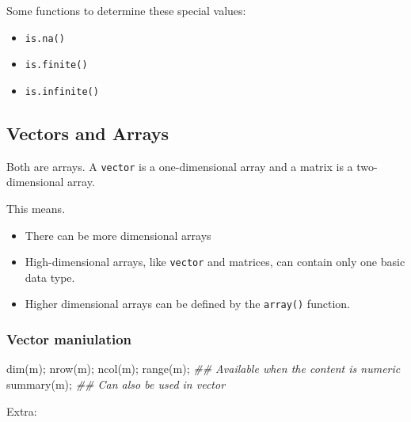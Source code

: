 \documentclass[
]{article}
\newenvironment{Shaded}{}{}
\newcommand{\DocumentationTok}[1]{\textcolor[rgb]{0.73,0.13,0.13}{\textit{#1}}}
\newcommand{\FunctionTok}[1]{\textcolor[rgb]{0.02,0.16,0.49}{#1}}
\newcommand{\NormalTok}[1]{#1}
\begin{document}
Some functions to determine these special values:

\begin{itemize}
\item
  \texttt{is.na()}
\item
  \texttt{is.finite()}
\item
  \texttt{is.infinite()}
\end{itemize}

\hypertarget{vectors-and-arrays}{%
\subsection{Vectors and Arrays}\label{vectors-and-arrays}}

Both are arrays. A \texttt{vector} is a one-dimensional array and a
matrix is a two-dimensional array.

This means.

\begin{itemize}
\item
  There can be more dimensional arrays
\item
  High-dimensional arrays, like \texttt{vector} and matrices, can
  contain only one basic data type.
\item
  Higher dimensional arrays can be defined by the \texttt{array()}
  function.
\end{itemize}

\hypertarget{vector-maniulation}{%
\subsubsection{Vector maniulation}\label{vector-maniulation}}

\begin{Shaded}
\begin{Highlighting}[]
\FunctionTok{dim}\NormalTok{(m);}
\FunctionTok{nrow}\NormalTok{(m);}
\FunctionTok{ncol}\NormalTok{(m);}
\FunctionTok{range}\NormalTok{(m); }\DocumentationTok{\#\# Available when the content is numeric}
\FunctionTok{summary}\NormalTok{(m); }\DocumentationTok{\#\# Can also be used in vector}
\end{Highlighting}
\end{Shaded}

Extra:
\end{document}
